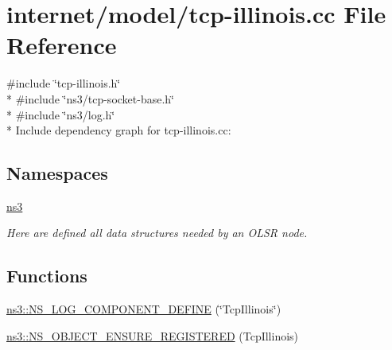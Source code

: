 \hypertarget{tcp-illinois_8cc}{}\section{internet/model/tcp-\/illinois.cc File Reference}
\label{tcp-illinois_8cc}
{\ttfamily \#include \char`\"{}tcp-\/illinois.\+h\char`\"{}}\\*
{\ttfamily \#include \char`\"{}ns3/tcp-\/socket-\/base.\+h\char`\"{}}\\*
{\ttfamily \#include \char`\"{}ns3/log.\+h\char`\"{}}\\*
Include dependency graph for tcp-\/illinois.cc\+:
\subsection*{Namespaces}
\begin{DoxyCompactItemize}
\item 
 \hyperlink{namespacens3}{ns3}
\begin{DoxyCompactList}\small\item\em Here are defined all data structures needed by an O\+L\+SR node. \end{DoxyCompactList}\end{DoxyCompactItemize}
\subsection*{Functions}
\begin{DoxyCompactItemize}
\item 
\hyperlink{namespacens3_adc7ffe6ff78b46db3b163c511770a9dc}{ns3\+::\+N\+S\+\_\+\+L\+O\+G\+\_\+\+C\+O\+M\+P\+O\+N\+E\+N\+T\+\_\+\+D\+E\+F\+I\+NE} (\char`\"{}Tcp\+Illinois\char`\"{})
\item 
\hyperlink{namespacens3_a6572a8a076492117d192f753f7c7ad56}{ns3\+::\+N\+S\+\_\+\+O\+B\+J\+E\+C\+T\+\_\+\+E\+N\+S\+U\+R\+E\+\_\+\+R\+E\+G\+I\+S\+T\+E\+R\+ED} (Tcp\+Illinois)
\end{DoxyCompactItemize}
